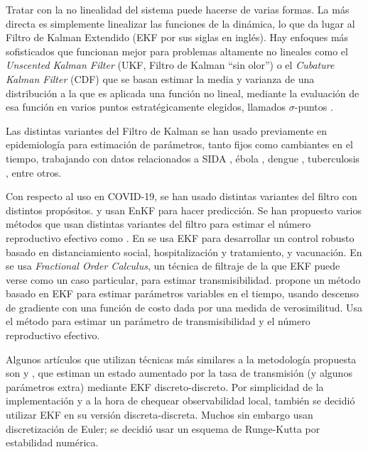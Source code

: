 Tratar con la no linealidad del sistema puede hacerse de varias formas. La más directa es simplemente linealizar las funciones de la dinámica, lo que da lugar al Filtro de Kalman Extendido (EKF por sus siglas en inglés). Hay enfoques más sofisticados que funcionan mejor para problemas altamente no lineales como el \textit{Unscented Kalman Filter} (UKF, Filtro de Kalman ``sin olor'') o el \textit{Cubature Kalman Filter} (CDF) que se basan estimar la media y varianza de una distribución a la que es aplicada una función no lineal, mediante la evaluación de esa función en varios puntos estratégicamente elegidos, llamados \(\sigma\)-puntos \cite{Kulikov2017}\cite{Simon2006}.

Las distintas variantes del Filtro de Kalman se han usado previamente en epidemiología para estimación de parámetros, tanto fijos como cambiantes en el tiempo, trabajando con datos relacionados a SIDA \cite{Cazelles1997}, ébola \cite{Ndanguza2017}, dengue \cite{Torres-Signes2021}, tuberculosis \cite{Narula2016}, entre otros. %

Con respecto al uso en COVID-19, se han usado distintas variantes del filtro con distintos propósitos. \cite{Yang2020} y \cite{Nkwayep2020} usan EnKF para hacer predicción. Se han propuesto varios métodos que usan distintas variantes del filtro para estimar el número reproductivo efectivo como \cite{Hasan2020}\cite{Arroyo-Marioli2021}\cite{Gomez-Exposito2021}. En \cite{Rajaei2021} se usa EKF para desarrollar un control robusto basado en distanciamiento social, hospitalización y tratamiento, y vacunación. En \cite{Bansal2021} se usa \textit{Fractional Order Calculus}, un técnica de filtraje de la que EKF puede verse como un caso particular, para estimar transmisibilidad. \cite{Song2021} propone un método basado en EKF para estimar parámetros variables en el tiempo, usando descenso de gradiente con una función de costo dada por una medida de verosimilitud. Usa el método para estimar un parámetro de transmisibilidad y el número reproductivo efectivo.

Algunos artículos que utilizan técnicas más similares a la metodología propuesta son \cite{Hasan2021} y \cite{Sameni2020}, que estiman un estado aumentado por la tasa de transmisión (y algunos parámetros extra) mediante EKF discreto-discreto. Por simplicidad de la implementación y a la hora de chequear observabilidad local, también se decidió utilizar EKF en su versión discreta-discreta. Muchos sin embargo usan discretización de Euler; se decidió usar un esquema de Runge-Kutta por estabilidad numérica.



